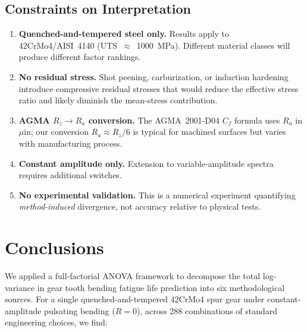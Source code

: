 \documentclass[12pt,a4paper]{article}
\begin{document}
\subsection{Constraints on Interpretation}

\begin{enumerate}
  \item \textbf{Quenched-and-tempered steel only.} Results apply to
        42CrMo4/AISI~4140 (UTS~$\approx$~1000~MPa). Different material
        classes will produce different factor rankings.
  \item \textbf{No residual stress.} Shot peening, carburization, or
        induction hardening introduce compressive residual stresses that
        would reduce the effective stress ratio and likely diminish the
        mean-stress contribution.
  \item \textbf{AGMA $R_z \rightarrow R_a$ conversion.} The AGMA~2001-D04
        $C_f$ formula uses $R_a$ in $\mu$in; our conversion $R_a \approx
        R_z/6$ is typical for machined surfaces but varies with
        manufacturing process.
  \item \textbf{Constant amplitude only.} Extension to variable-amplitude
        spectra requires additional switches.
  \item \textbf{No experimental validation.} This is a numerical
        experiment quantifying \emph{method-induced} divergence, not
        accuracy relative to physical tests.
\end{enumerate}

\section{Conclusions}
\label{sec:conclusions}

We applied a full-factorial ANOVA framework to decompose the total
log-variance in gear tooth bending fatigue life prediction into six
methodological sources. For a single quenched-and-tempered 42CrMo4 spur
gear under constant-amplitude pulsating bending ($R=0$), across 288
combinations of standard engineering choices, we find:
\end{document}
